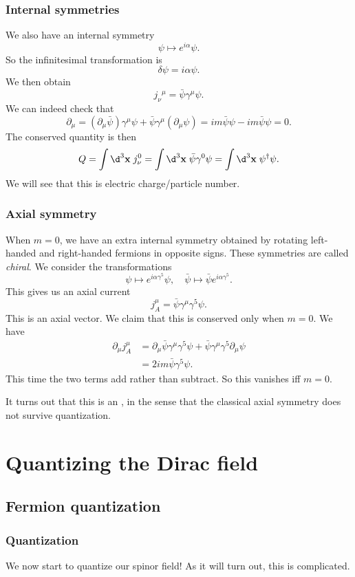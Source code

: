 \documentclass[a4paper]{article}
\begin{document}
\subsubsection*{Internal symmetries}
We also have an internal symmetry
\[
  \psi \mapsto e^{i\alpha} \psi.
\]
So the infinitesimal transformation is
\[
  \delta \psi = i \alpha \psi.
\]
We then obtain
\[
  j_\nu\!^\mu = \bar\psi \gamma^\mu \psi.
\]
We can indeed check that
\[
  \partial_\mu = (\partial_\mu \bar\psi) \gamma^\mu \psi + \bar\psi \gamma^\mu (\partial_\mu \psi) = im \bar\psi \psi - im \bar\psi \psi = 0.
\]
The conserved quantity is then
\[
  Q = \int \d^3 \mathbf{x}\; j_\nu^0 = \int \d^3 \mathbf{x}\; \bar\psi \gamma^0 \psi = \int \d^3 \mathbf{x}\; \psi^\dagger \psi.
\]
We will see that this is electric charge/particle number.

\subsubsection*{Axial symmetry}
When $m = 0$, we have an extra internal symmetry obtained by rotating left-handed and right-handed fermions in opposite signs. These symmetries are called \emph{chiral}. We consider the transformations
\[
  \psi \mapsto e^{i \alpha \gamma^5} \psi,\quad \bar\psi \mapsto \bar\psi e^{i\alpha \gamma^5}.
\]
This gives us an axial current
\[
  j_A^\mu = \bar\psi \gamma^\mu \gamma^5 \psi.
\]
This is an axial vector. We claim that this is conserved only when $m = 0$. We have
\begin{align*}
  \partial_\mu j_A^\mu &= \partial_\mu \bar\psi \gamma^\mu \gamma^5 \psi + \bar\psi \gamma^\mu \gamma^5 \partial_\mu \psi\\
  &= 2im \bar\psi\gamma^5 \psi.
\end{align*}
This time the two terms add rather than subtract. So this vanishes iff $m = 0$.

It turns out that this is an , in the sense that the classical axial symmetry does not survive quantization.

\section{Quantizing the Dirac field}
\subsection{Fermion quantization}
\subsubsection*{Quantization}
We now start to quantize our spinor field! As it will turn out, this is complicated.
\end{document}
